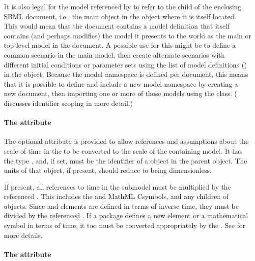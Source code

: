 It is also legal for the model referenced by  to refer
to the  child of the enclosing SBML document, i.e., the
main \Model object in the \SBML object where it is itself located.  This
would mean that the document contains a model definition that itself
contains (and perhaps modifies) the model it presents to the world as
the main or top-level model in the document.  A possible use for this
might be to define a common scenario in the main model, then create
alternate scenarios with different initial conditions or parameter sets
using the list of model definitions () in the
\SBML object.  Because the model namespace is defined per document, this
means that it is possible to define and include a new model namespace by
creating a new document, then importing one or more of those models
using the \ExternalModelDefinition class.  ( discusses
identifier scoping in more detail.)


\label{submodel-timeconversionfactor}
\paragraph{The \fixttspace{} attribute}

The optional  attribute is provided to allow
references and assumptions about the scale of time in the \Submodel to be converted to 
the scale of the containing model.  It has the type ,
and, if set, must be the identifier of a \Parameter object in the 
parent \Model object.  The units of that \Parameter object, if present,
should reduce to being dimensionless.

If present, all references to time in the submodel must be multiplied
by the referenced \Parameter.  This includes the  and 
 MathML Csymbols, and any \Delay children of \Event objects.
Since \RateRule and \KineticLaw elements are defined in terms of inverse
time, they must be divided by the referenced \Parameter.  If a package
defines a new element or a mathematical symbol in terms of time, it too
must be converted appropriately by the .
See  for more details.

\label{submodel-extentconversionfactor}
\paragraph{The \fixttspace{} attribute}
  

